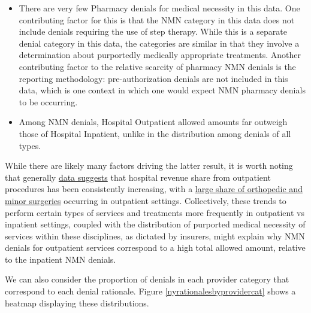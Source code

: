 \documentclass[12pt, a4paper,twoside,parskip=full]{report}
\theoremstyle{plain} %
\theoremstyle{definition} %
\theoremstyle{remark} %
\numberwithin{equation}{chapter}
\begin{document}
		\begin{itemize}
			\item There are very few Pharmacy denials for medical necessity in this data. One contributing factor for this is that the NMN category in this data does not include denials requiring the use of step therapy. While this is a separate denial category in this data, the categories are similar in that they involve a determination about purportedly medically appropriate treatments. Another contributing factor to the relative scarcity of pharmacy NMN denials is the reporting methodology: pre-authorization denials are not included in this data, which is one context in which one would expect NMN pharmacy denials to be occurring.
			
			\item Among NMN denials, Hospital Outpatient allowed amounts far outweigh those of Hospital Inpatient, unlike in the distribution among denials of all types.
			
		\end{itemize}
	
	
		While there are likely many factors driving the latter result, it is worth noting that generally \href{https://www2.deloitte.com/us/en/insights/industry/health-care/outpatient-virtual-health-care-trends.html}{data suggests} that hospital revenue share from outpatient procedures has been consistently increasing, with a \href{https://www.mckinsey.com/industries/healthcare/our-insights/walking-out-of-the-hospital-the-continued-rise-of-ambulatory-care-and-how-to-take-advantage-of-it}{large share of orthopedic and minor surgeries} occurring in outpatient settings. Collectively, these trends to perform certain types of services and treatments more frequently in outpatient vs inpatient settings, coupled with the distribution of purported medical necessity of services within these disciplines, as dictated by insurers, might explain why NMN denials for outpatient services correspond to a high total allowed amount, relative to the inpatient NMN denials.
		
		We can also consider the proportion of denials in each provider category that correspond to each denial rationale. Figure \ref{nyrationalesbyprovidercat} shows a heatmap displaying these distributions.
		
\end{document}
